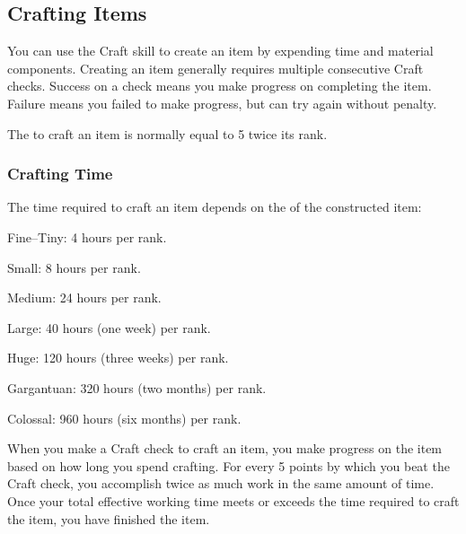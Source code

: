   \subsection{Crafting Items}\label{Crafting Items}
    You can use the Craft skill to create an item by expending time and material components.
    Creating an item generally requires multiple consecutive Craft checks.
    Success on a check means you make progress on completing the item.
    Failure means you failed to make progress, but can try again without penalty.

    The  to craft an item is normally equal to 5 \add twice its rank.

    \subsubsection{Crafting Time}
      The time required to craft an item depends on the  of the constructed item:
      \begin{raggeditemize}
        \item Fine--Tiny: 4 hours per rank.
        \item Small: 8 hours per rank.
        \item Medium: 24 hours per rank.
        \item Large: 40 hours (one week) per rank.
        \item Huge: 120 hours (three weeks) per rank.
        \item Gargantuan: 320 hours (two months) per rank.
        \item Colossal: 960 hours (six months) per rank.
      \end{raggeditemize}

      When you make a Craft check to craft an item, you make progress on the item based on how long you spend crafting.
      For every 5 points by which you beat the Craft check, you accomplish twice as much work in the same amount of time.
      Once your total effective working time meets or exceeds the time required to craft the item, you have finished the item.

